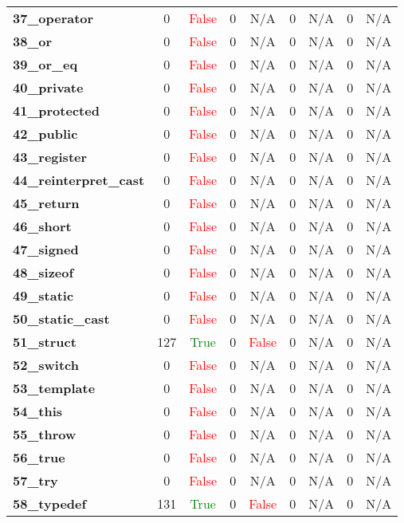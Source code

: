 \documentclass{article}
\begin{document}
\begin{xltabular}{\textwidth}{lcccccccc}
\textbf{37\_operator}& 0&\textcolor{red}{False}& 0&N/A& 0&N/A& 0&N/A \\[0.5ex]
\textbf{38\_or}& 0&\textcolor{red}{False}& 0&N/A& 0&N/A& 0&N/A \\[0.5ex]
\textbf{39\_or\_eq}& 0&\textcolor{red}{False}& 0&N/A& 0&N/A& 0&N/A \\[0.5ex]
\textbf{40\_private}& 0&\textcolor{red}{False}& 0&N/A& 0&N/A& 0&N/A \\[0.5ex]
\textbf{41\_protected}& 0&\textcolor{red}{False}& 0&N/A& 0&N/A& 0&N/A \\[0.5ex]
\textbf{42\_public}& 0&\textcolor{red}{False}& 0&N/A& 0&N/A& 0&N/A \\[0.5ex]
\textbf{43\_register}& 0&\textcolor{red}{False}& 0&N/A& 0&N/A& 0&N/A \\[0.5ex]
\textbf{44\_reinterpret\_cast}& 0&\textcolor{red}{False}& 0&N/A& 0&N/A& 0&N/A \\[0.5ex]
\textbf{45\_return}& 0&\textcolor{red}{False}& 0&N/A& 0&N/A& 0&N/A \\[0.5ex]
\textbf{46\_short}& 0&\textcolor{red}{False}& 0&N/A& 0&N/A& 0&N/A \\[0.5ex]
\textbf{47\_signed}& 0&\textcolor{red}{False}& 0&N/A& 0&N/A& 0&N/A \\[0.5ex]
\textbf{48\_sizeof}& 0&\textcolor{red}{False}& 0&N/A& 0&N/A& 0&N/A \\[0.5ex]
\textbf{49\_static}& 0&\textcolor{red}{False}& 0&N/A& 0&N/A& 0&N/A \\[0.5ex]
\textbf{50\_static\_cast}& 0&\textcolor{red}{False}& 0&N/A& 0&N/A& 0&N/A \\[0.5ex]
\textbf{51\_struct}& 127&\textcolor{green}{True}& 0&\textcolor{red}{False}& 0&N/A& 0&N/A \\[0.5ex]
\textbf{52\_switch}& 0&\textcolor{red}{False}& 0&N/A& 0&N/A& 0&N/A \\[0.5ex]
\textbf{53\_template}& 0&\textcolor{red}{False}& 0&N/A& 0&N/A& 0&N/A \\[0.5ex]
\textbf{54\_this}& 0&\textcolor{red}{False}& 0&N/A& 0&N/A& 0&N/A \\[0.5ex]
\textbf{55\_throw}& 0&\textcolor{red}{False}& 0&N/A& 0&N/A& 0&N/A \\[0.5ex]
\textbf{56\_true}& 0&\textcolor{red}{False}& 0&N/A& 0&N/A& 0&N/A \\[0.5ex]
\textbf{57\_try}& 0&\textcolor{red}{False}& 0&N/A& 0&N/A& 0&N/A \\[0.5ex]
\textbf{58\_typedef}& 131&\textcolor{green}{True}& 0&\textcolor{red}{False}& 0&N/A& 0&N/A \\[0.5ex]

\end{xltabular}
\end{document}
